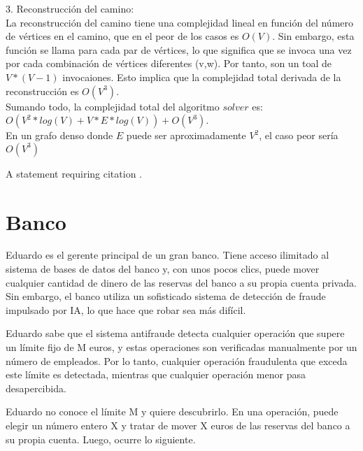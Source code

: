 \documentclass[
10pt, %
a4paper, %
oneside, %
headinclude,footinclude, %
BCOR5mm, %
]{scrartcl}
\begin{document}
3. Reconstrucción del camino:\\

La reconstrucción del camino tiene una complejidad lineal en función del número de vértices en el camino, que en el peor 
de los casos es $O(V)$. Sin embargo, esta función se llama para cada par de vértices, lo que significa que se invoca una vez por cada 
combinación de vértices diferentes (v,w). Por tanto, son un toal de $V*(V-1)$ invocaiones. Esto implica que la complejidad total derivada de la 
reconstrucción es $O(V^3)$. \\

Sumando todo, la complejidad total del algoritmo $solver$ es: $O(V^2 * log(V) + V * E*log(V) ) + O(V^3)$. \\

En un grafo denso donde $E$ puede ser aproximadamente $V^2$, el caso peor sería $O(V^3)$





A statement requiring citation \cite{Figueredo:2009dg}.


 

\section{Banco}

Eduardo es el gerente principal de un gran banco. Tiene acceso ilimitado al sistema de bases de datos del banco y, con unos pocos clics, puede mover cualquier cantidad de dinero de las reservas del banco a su propia cuenta privada. Sin embargo, el banco utiliza un sofisticado sistema de detección de fraude impulsado por IA, lo que hace que robar sea más difícil.

Eduardo sabe que el sistema antifraude detecta cualquier operación que supere un límite fijo de M euros, y estas operaciones son verificadas manualmente por un número de empleados. Por lo tanto, cualquier operación fraudulenta que exceda este límite es detectada, mientras que cualquier operación menor pasa desapercibida.

Eduardo no conoce el límite M y quiere descubrirlo. En una operación, puede elegir un número entero X y tratar de mover X euros de las reservas del banco a su propia cuenta. Luego, ocurre lo siguiente.
\end{document}
